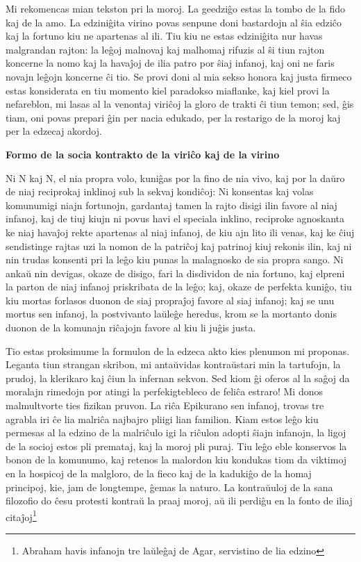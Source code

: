 \documentclass{book}
\begin{document}
Mi rekomencas mian tekston pri la moroj. La geedziĝo estas la
tombo de la fido kaj de la amo. La edziniĝita virino povas
senpune doni bastardojn al ŝia edziĉo kaj la fortuno kiu ne
apartenas al ili. Tiu kiu ne estas edziniĝita nur havas
malgrandan rajton: la leĝoj malnovaj kaj malhomaj rifuzis al ŝi
tiun rajton koncerne la nomo kaj la havaĵoj de ilia patro por
ŝiaj infanoj, kaj oni ne faris novajn leĝojn koncerne ĉi tio. Se
provi doni al mia sekso honora kaj justa firmeco estas
konsiderata en tiu momento kiel paradokso miaflanke, kaj kiel
provi la nefareblon, mi lasas al la venontaj viriĉoj la gloro de
trakti ĉi tiun temon; sed, ĝis tiam, oni povas prepari ĝin per
nacia edukado, per la restarigo de la moroj kaj per la edzecaj
akordoj.

\vspace{2em}
\noindent\textbf{Formo de la socia kontrakto de la viriĉo kaj de
la virino}
\vspace{1em}

Ni N kaj N, el nia propra volo, kuniĝas por la fino de nia vivo,
kaj por la daŭro de niaj reciprokaj inklinoj sub la sekvaj
kondiĉoj: Ni konsentas kaj volas komunumigi niajn fortunojn,
gardantaj tamen la rajto disigi ilin favore al niaj infanoj, kaj
de tiuj kiujn ni povus havi el speciala inklino, reciproke
agnoskanta ke niaj havaĵoj rekte apartenas al niaj infanoj, de
kiu ajn lito ili venas, kaj ke ĉiuj sendistinge rajtas uzi la
nomon de la patriĉoj kaj patrinoj kiuj rekonis ilin, kaj ni nin
trudas konsenti pri la leĝo kiu punas la malagnosko de sia propra
sango. Ni ankaŭ nin devigas, okaze de disigo, fari la disdividon
de nia fortuno, kaj elpreni la parton de niaj infanoj priskribata
de la leĝo; kaj, okaze de perfekta kuniĝo, tiu kiu mortas
forlasos duonon de siaj propraĵoj favore al siaj infanoj; kaj se
unu mortus sen infanoj, la postvivanto laŭleĝe heredus, krom se
la mortanto donis duonon de la komunajn riĉajojn favore al kiu li
juĝis justa.

Tio estas proksimume la formulon de la edzeca akto kies plenumon
mi proponas. Leganta tiun strangan skribon, mi antaŭvidas
kontraŭstari min la tartufojn, la prudoj, la klerikaro kaj ĉiun
la infernan sekvon. Sed kiom ĝi oferos al la saĝoj da moralajn
rimedojn por atingi la perfekigtebleco de feliĉa estraro! Mi
donos malmultvorte ties fizikan pruvon. La riĉa Epikurano sen
infanoj, trovas tre agrabla iri ĉe lia malriĉa najbajro pliigi
lian familion. Kiam estos leĝo kiu permesas al la edzino de la
malriĉulo igi la riĉulon adopti ŝiajn infanojn, la ligoj de la
socioj estos pli premataj, kaj la moroj pli puraj. Tiu leĝo eble
konservos la bonon de la komunumo, kaj retenos la malordon kiu
kondukas tiom da viktimoj en la hospicoj de la malgloro, de la
fieco kaj de la kadukiĝo de la homaj principoj, kie, jam de
longtempe, ĝemas la naturo. La kontraŭuloj de la sana filozofio
do ĉesu protesti kontraŭ la praaj moroj, aŭ ili perdiĝu en la
fonto de iliaj citaĵoj\footnote{Abraham havis infanojn tre
laŭleĝaj de Agar, servistino de lia edzino}
\end{document}
